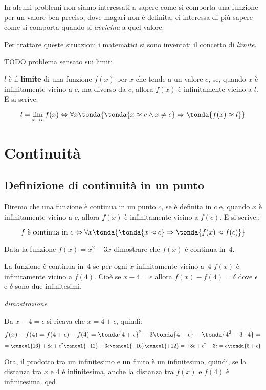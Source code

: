 In alcuni problemi non siamo interessati a sapere come si comporta una funzione 
per un valore ben preciso, dove magari non è definita, ci interessa di più 
sapere come si comporta quando si \emph{avvicina} a quel valore.

Per trattare queste situazioni i matematici si sono inventati il concetto di 
\emph{limite}.

TODO problema sensato sui limiti.

\begin{definizione}
\(l\) è il \textbf{limite} di una funzione \(f(x)\) per \(x\) che tende a un 
valore \(c\), se, quando \(x\) è infinitamente vicino a \(c\), 
ma diverso da \(c\), 
allora \(f(x)\) è infinitamente vicino a \(l\). E si scrive:

\[l=\lim_{x \rightarrow c} f(x) \Leftrightarrow 
\forall x \tonda{\tonda{x \approx c \wedge x \neq c} \Rightarrow 
\tonda{f(x) \approx l}}\]

\end{definizione}


\section{Continuità}
\label{sec:cont_continuita}

\subsection{Definizione di continuità in un punto}
\label{subsec:cont_definizione}


\begin{definizione}
Diremo che una funzione è continua in un punto \(c\), se è definita in \(c\) e, 
quando \(x\) è infinitamente vicino a \(c\), 
allora \(f(x)\) è infinitamente vicino a \(f(c)\). E si scrive::

\[f \text{ è continua in } c \Leftrightarrow 
\forall x \tonda{\tonda{x \approx c} \Rightarrow 
\tonda{f(x) \approx f(c)}}\]

\end{definizione}

\begin{esempio}
 Data la funzione \(f(x)=x^2-3x\) dimostrare che \(f(x)\) è continua in~4.
 
 La funzione è continua in~4 se per ogni \(x\) infinitamente vicino a~4 
 \(f(x)\) è infinitamente vicino a \(f(4)\). Cioè se \(x -4=\epsilon\) allora
 \(f(x) -f(4) = \delta\) dove \(\epsilon\) e \(\delta\) sono due infinitesimi.
 
\emph{dimostrazione}

Da \(x-4=\epsilon\) si ricava che \(x=4+\epsilon\), quindi: 
\[f(x) -f(4) = f(4+\epsilon) -f(4) = 
\tonda{4+\epsilon}^2-3\tonda{4+\epsilon}-\tonda{4^2-3\cdot 4}=\]
\[=\cancel{16}+8\epsilon+\epsilon^2\cancel{-12} 
  -3\epsilon\cancel{-16}\cancel{+12} = 
  +8\epsilon+\epsilon^2 -3\epsilon = 
\epsilon \tonda{5 + \epsilon}\]

Ora, il prodotto tra un infinitesimo e un finito è un infinitesimo, quindi, se 
la distanza tra \(x\) e \(4\) è infinitesima, anche la distanza tra 
\(f(x)\) e \(f(4)\) è infinitesima. qed 
 
\end{esempio}

